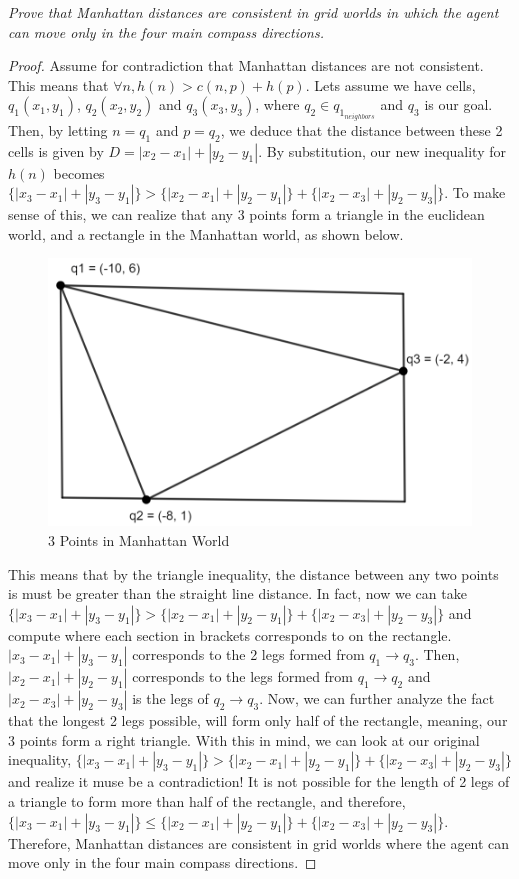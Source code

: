 \linebreak
\begin{qoute}
\emph{Prove that Manhattan distances are consistent in
grid worlds in which the agent can move only in the four main compass directions.}
\end{qoute}
\begin{proof}
Assume for contradiction that Manhattan distances are not consistent. This means that $\forall n, h(n) > c(n,p) + h(p)$. Lets assume we have cells, $q_1(x_1,y_1)$, $q_2(x_2,y_2)$ and $q_3(x_3,y_3)$, where $q_2 \in q_1_{neighbors}$ and $q_3$ is our goal. Then, by letting $n = q_1$ and $p = q_2$, we deduce that the distance between these 2 cells is given by $D = |x_2 - x_1| + |y_2 - y_1|$. By substitution, our new inequality for $h(n)$ becomes $\{|x_3 - x_1| + |y_3 - y_1|\} > \{|x_2 - x_1| + |y_2 - y_1|\} + \{|x_2 - x_3| + |y_2 - y_3|\}$. To make sense of this, we can realize that any 3 points form a triangle in the euclidean world, and a rectangle in the Manhattan world, as shown below.
\begin{figure}[H]
  \centering
  \includegraphics[width=0.5\linewidth]{Report/Part4/Capture.PNG}  
\caption{3 Points in Manhattan World}
\end{figure}

This means that by the triangle inequality, the distance between any two points is must be greater than the straight line distance. In fact, now we can take $\{|x_3 - x_1| + |y_3 - y_1|\} > \{|x_2 - x_1| + |y_2 - y_1|\} + \{|x_2 - x_3| + |y_2 - y_3|\}$ and compute where each section in brackets corresponds to on the rectangle. $|x_3 - x_1| + |y_3 - y_1|$ corresponds to the 2 legs formed from $q_1 \rightarrow q_3$. Then, $|x_2 - x_1| + |y_2 - y_1|$ corresponds to the legs formed from $q_1 \rightarrow q_2$ and $|x_2 - x_3| + |y_2 - y_3|$ is the legs of $q_2 \rightarrow q_3$. Now, we can further analyze the fact that the longest 2 legs possible, will form only half of the rectangle, meaning, our 3 points form a right triangle. With this in mind, we can look at our original inequality, $\{|x_3 - x_1| + |y_3 - y_1|\} > \{|x_2 - x_1| + |y_2 - y_1|\} + \{|x_2 - x_3| + |y_2 - y_3|\}$ and realize it muse be a contradiction! It is not possible for the length of 2 legs of a triangle to form more than half of the rectangle, and therefore, $\{|x_3 - x_1| + |y_3 - y_1|\} \leq \{|x_2 - x_1| + |y_2 - y_1|\} + \{|x_2 - x_3| + |y_2 - y_3|\}$. Therefore, Manhattan distances are consistent in grid worlds where the agent can move only in the four main compass directions.
\end{proof}


